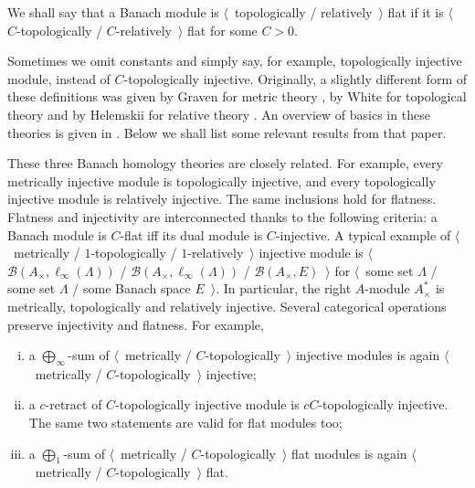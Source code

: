 \documentclass[12pt]{article}
\begin{document}
We shall say that a Banach module is $\langle$~topologically / relatively~$\rangle$ flat if it is $\langle$~$C$-topologically / $C$-relatively~$\rangle$ flat for some $C>0$.

Sometimes we omit constants and simply say, for example, topologically injective module, instead of $C$-topologically injective. Originally, a slightly different form of these definitions was given by Graven for metric theory \cite{GravInjProjBanMod}, by White for topological theory \cite{WhiteInjmoduAlg} and by Helemskii for relative theory \cite{HelemHomolDimNorModBanAlg}. An overview of basics in these theories is given in \cite{NemGeomProjInjFlatBanMod}. Below we shall list some relevant results from that paper.

These three Banach homology theories are closely related. For example, every metrically injective module is topologically injective, and every topologically injective module is relatively injective. The same inclusions hold for flatness. Flatness and injectivity are interconnected thanks to the following criteria: a Banach module is $C$-flat iff its dual module is $C$-injective. A typical example of $\langle$~metrically / $1$-topologically / $1$-relatively~$\rangle$ injective module is $\langle$~$\mathcal{B}(A_\times, \ell_\infty(\Lambda))$ / $\mathcal{B}(A_\times, \ell_\infty(\Lambda))$ / $\mathcal{B}(A_\times, E)$~$\rangle$ for $\langle$~some set $\Lambda$ / some set $\Lambda$ / some Banach space $E$~$\rangle$. In particular, the right $A$-module $A_\times^*$ is metrically, topologically and relatively injective. Several categorical operations preserve injectivity and flatness. For example,
\begin{enumerate}[i)]
\item a $\bigoplus_\infty$-sum of $\langle$~metrically / $C$-topologically~$\rangle$ injective modules is again $\langle$~metrically / $C$-topologically~$\rangle$ injective;

\item a $c$-retract of $C$-topologically injective module is $cC$-topologically injective. The same two statements are valid for flat modules too;

\item a $\bigoplus_1$-sum of $\langle$~metrically / $C$-topologically~$\rangle$ flat modules is again $\langle$~metrically / $C$-topologically~$\rangle$ flat.
\end{enumerate}
\end{document}
